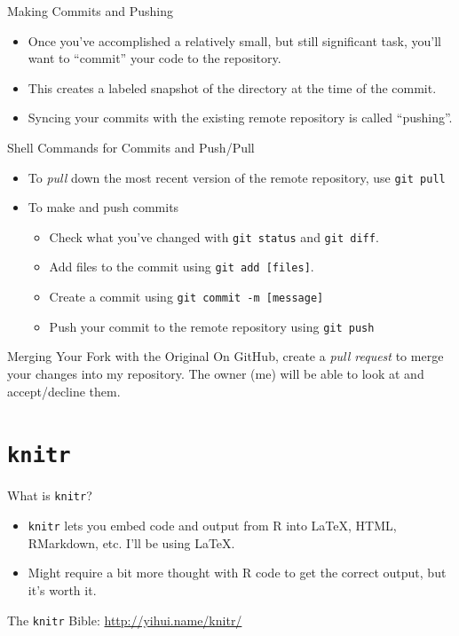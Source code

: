 \documentclass{beamer}
\begin{document}
	\begin{frame}{Making Commits and Pushing}
		\begin{itemize}
			\item Once you've accomplished a relatively small, but still significant task, you'll want to ``commit'' your code to the repository.
			\item This creates a labeled snapshot of the directory at the time of the commit.
			\item Syncing your commits with the existing remote repository is called ``pushing''.
		\end{itemize}
	\end{frame}
	
	\begin{frame}{Shell Commands for Commits and Push/Pull}
		\begin{itemize}
			\item To \textit{pull} down the most recent version of the remote repository, use \texttt{git pull}
			\item To make and push commits
			\begin{itemize}
				\item Check what you've changed with \texttt{git status} and \texttt{git diff}.
				\item Add files to the commit using \texttt{git add [files]}.
				\item Create a commit using \texttt{git commit -m [message]}
				\item Push your commit to the remote repository using \texttt{git push}
			\end{itemize}
		\end{itemize}
	\end{frame}
	
	\begin{frame}{Merging Your Fork with the Original}
		On GitHub, create a \textit{pull request} to merge your changes into my repository. The owner (me) will be able to look at and accept/decline them.
	\end{frame}
	
	\section{\texttt{knitr}}
	
	\begin{frame}{What is \texttt{knitr}?}
		\begin{itemize}
			\item \texttt{knitr} lets you embed code and output from R into \LaTeX, HTML, RMarkdown, etc. I'll be using \LaTeX.
			\item Might require a bit more thought with R code to get the correct output, but it's worth it.
		\end{itemize}
		The \texttt{knitr} Bible: \url{http://yihui.name/knitr/}
	\end{frame}
	
\end{document}

